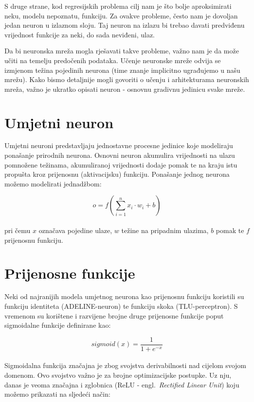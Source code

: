 \documentclass[times, utf8, zavrsni, numeric]{fer}
\begin{document}
S druge strane, kod regresijskih problema cilj nam je što bolje aproksimirati neku, modelu nepoznatu, funkciju. Za ovakve probleme, često nam je dovoljan jedan neuron u izlaznom sloju. 
Taj neuron na izlazu bi trebao davati predviđenu vrijednost funkcije za neki, do sada neviđeni, ulaz.

Da bi neuronska mreža mogla rješavati takve probleme, važno nam je da može učiti na temelju predočenih podataka. Učenje neuronske mreže odvija se izmjenom težina pojedinih neurona (time znanje implicitno ugrađujemo u našu mrežu).
Kako bismo detaljnije mogli govoriti o učenju i arhitekturama neuronskih mreža, važno je ukratko opisati neuron - osnovnu gradivnu jedinicu svake mreže.
\pagebreak
\section{Umjetni neuron}
Umjetni neuroni predstavljaju jednostavne procesne jedinice koje modeliraju ponašanje prirodnih neurona. Osnovni neuron akumulira vrijednosti na ulazu pomnožene težinama, 
akumuliranoj vrijednosti dodaje pomak te na kraju istu propušta kroz prijenosnu (aktivacijsku) funkciju. Ponašanje jednog neurona možemo modelirati jednadžbom:

\begin{equation}
    o = f(\sum_{i=1}^{n}x_{i} \cdot w_{i} + b)
    \label{eq:neuron}
\end{equation}
\\
\noindent pri čemu $x$ označava pojedine ulaze, $w$ težine na pripadnim ulazima, $b$ pomak te $f$ prijenosnu funkciju. 

\section{Prijenosne funkcije}
Neki od najranijih modela umjetnog neurona kao prijenosnu funkciju koristili su funkciju identiteta (ADELINE-neuron) te funkciju skoka (TLU-perceptron).
S vremenom su korištene i razvijene brojne druge prijenosne funkcije poput sigmoidalne funkcije definirane kao:

\begin{equation}
    sigmoid(x) = \frac{1}{1 + e^{-x}}
    \label{eq:sigmoid}
\end{equation}
\\
Sigmoidalna funkcija značajna je zbog svojstva derivabilnosti nad cijelom svojom domenom. Ovo svojstvo važno je za brojne optimizacijske postupke.
Uz nju, danas je veoma značajna i zglobnica (ReLU - engl.\ \textit{Rectified Linear Unit}) koju možemo prikazati na sljedeći način:
\end{document}
